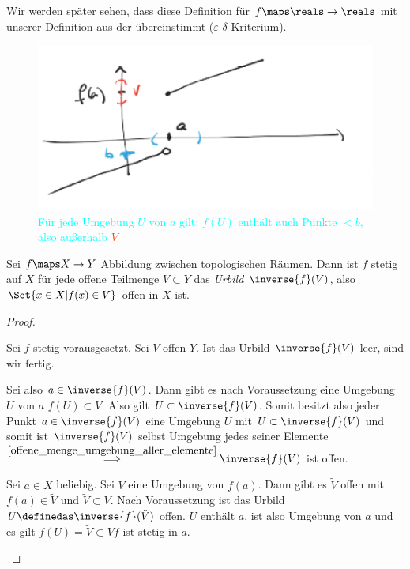 \begin{bemerkung*}
    Wir werden später sehen, dass diese Definition für \( f\maps \reals\to\reals \) mit unserer Definition aus der  übereinstimmt (\( \varepsilon \)-\( \delta \)-Kriterium).
\end{bemerkung*}
\begin{figure}[H]
    \centering
    \includegraphics[width=0.6\linewidth]{figures/topologische_unstetigkeit_beispiel_aus_r}
    \caption*{\textcolor{Cyan}{Für jede Umgebung \( U \) von \( a \) gilt: \( f(U) \) enthält auch Punkte \( <b \), also außerhalb }\textcolor{OrangeRed}{\( V \)}}
    \label{fig:topologische_unstetigkeit_beispiel_aus_r}
\end{figure}
\begin{satz}\label{stetigkeit_in_topologischen_raeumen:urbildkriterium}
    Sei \( f\maps X\to Y \) Abbildung zwischen topologischen Räumen. 
    Dann ist \( f \) stetig auf \( X \) \gdw für jede offene Teilmenge \( V\subset Y \) das \emph{Urbild} \( \inverse{f}(V) \), also \( \Set{x\in X|f(x)\in V} \) offen in \( X \) ist.
\end{satz}
\begin{proof}
    \begin{proofdescription}
        
        \item[\hin] Sei \( f \) stetig vorausgesetzt.
        Sei \( V \) offen \( Y \). Ist das Urbild \( \inverse{f}(V) \) leer, sind wir fertig.
        
        Sei also \( a\in \inverse{f}(V) \). 
        Dann gibt es nach Voraussetzung eine Umgebung \( U \) von \( a \) \sd \( f(U)\subset V \). 
        Also gilt \( U \subset \inverse{f}(V)\). 
        Somit besitzt also jeder Punkt \( a\in \inverse{f}(V) \) eine Umgebung \( U \) mit \( U\subset \inverse{f}(V) \) und somit ist \( \inverse{f}(V) \) selbst Umgebung jedes seiner Elemente \( \overset{\ref{offene_menge_umgebung_aller_elemente}}{\implies} \inverse{f}(V)\) ist offen.

        
        \item[\rueck] Sei \( a\in X \) beliebig. Sei \( V \) eine Umgebung von \( f(a) \). Dann gibt es \( \tilde{V} \) offen mit \( f(a)\in \tilde{V} \) und \( \tilde{V}\subset V \). Nach Voraussetzung ist das Urbild \( U\definedas \inverse{f}(\tilde{V}) \) offen. \( U \) enthält \( a \), ist also Umgebung von \( a \) und es gilt \( f(U)=\tilde{V}\subset V \)\timplies \( f \) ist stetig in \( a \).
    \end{proofdescription}
    
\end{proof}
